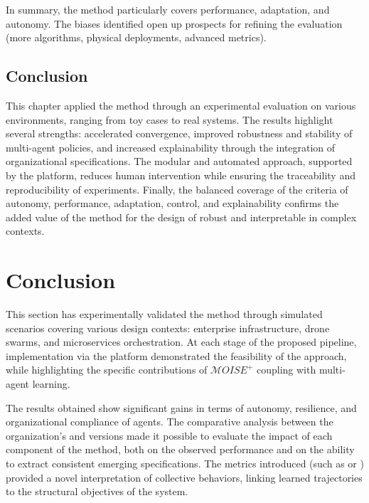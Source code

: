   \medskip
  In summary, the  method particularly covers performance, adaptation, and autonomy. The biases identified open up prospects for refining the evaluation (more algorithms, physical deployments, advanced metrics).

  \section{Conclusion}

  This chapter applied the  method through an experimental evaluation on various environments, ranging from toy cases to real systems. The results highlight several strengths: accelerated convergence, improved robustness and stability of multi-agent policies, and increased explainability through the integration of organizational specifications. The modular and automated approach, supported by the  platform, reduces human intervention while ensuring the traceability and reproducibility of experiments. Finally, the balanced coverage of the criteria of autonomy, performance, adaptation, control, and explainability confirms the added value of the method for the design of robust and interpretable  in complex contexts.

  \clearpage
  \thispagestyle{empty}
  \null
  \newpage


  \chapter*{Conclusion}

  This section has experimentally validated the  method through simulated scenarios covering various  design contexts: enterprise infrastructure, drone swarms, and microservices orchestration. At each stage of the proposed pipeline, implementation via the  platform demonstrated the feasibility of the approach, while highlighting the specific contributions of $\mathcal{M}OISE^+$ coupling with multi-agent learning.

The results obtained show significant gains in terms of autonomy, resilience, and organizational compliance of agents. The comparative analysis between the organization's  and  versions made it possible to evaluate the impact of each component of the method, both on the observed performance and on the ability to extract consistent emerging specifications. The metrics introduced (such as  or ) provided a novel interpretation of collective behaviors, linking learned trajectories to the structural objectives of the system.

